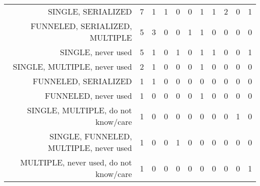 {\begin{landscape}
\begin{longtable}[htb]{r|c|c|c|c|c|c|c|c|c|c}
{SINGLE, SERIALIZED} & 7 & 1 & 1 & 0 & 0 & 1 & 1 & 2 & 0 & 1 \\%
{FUNNELED, SERIALIZED, MULTIPLE} & 5 & 3 & 0 & 0 & 1 & 1 & 0 & 0 & 0 & 0 \\%
{SINGLE, never used} & 5 & 1 & 0 & 1 & 0 & 1 & 1 & 0 & 0 & 1 \\%
{SINGLE, MULTIPLE, never used} & 2 & 1 & 0 & 0 & 0 & 1 & 0 & 0 & 0 & 0 \\%
{FUNNELED, SERIALIZED} & 1 & 1 & 0 & 0 & 0 & 0 & 0 & 0 & 0 & 0 \\%
{FUNNELED, never used} & 1 & 0 & 0 & 0 & 0 & 1 & 0 & 0 & 0 & 0 \\%
{SINGLE, MULTIPLE, do not know/care} & 1 & 0 & 0 & 0 & 0 & 0 & 0 & 0 & 1 & 0 \\%
{SINGLE, FUNNELED, MULTIPLE, never used} & 1 & 0 & 0 & 1 & 0 & 0 & 0 & 0 & 0 & 0 \\%
{MULTIPLE, never used, do not know/care} & 1 & 0 & 0 & 0 & 0 & 0 & 0 & 0 & 0 & 1 \\%
\hline%
\end{longtable}%
\end{landscape}}%
\clearpage%
